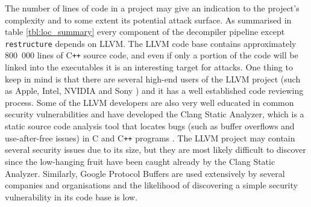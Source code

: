 The number of lines of code in a project may give an indication to the project's complexity and to some extent its potential attack surface. As summarised in table \ref{tbl:loc_summary} every component of the decompiler pipeline except \texttt{restructure} depends on LLVM. The LLVM code base contains approximately 800~000 lines of C\texttt{++} source code, and even if only a portion of the code will be linked into the executables it is an interesting target for attacks. One thing to keep in mind is that there are several high-end users of the LLVM project (such as Apple, Intel, NVIDIA and Sony \cite{llvm_users}) and it has a well established code reviewing process. Some of the LLVM developers are also very well educated in common security vulnerabilities and have developed the Clang Static Analyzer, which is a static source code analysis tool that locates bugs (such as buffer overflows and use-after-free issues) in C and C\texttt{++} programs \cite{clang_analyzer}. The LLVM project may contain several security issues due to its size, but they are most likely difficult to discover since the low-hanging fruit have been caught already by the Clang Static Analyzer. Similarly, Google Protocol Buffers are used extensively by several companies and organisations and the likelihood of discovering a simple security vulnerability in its code base is low.

